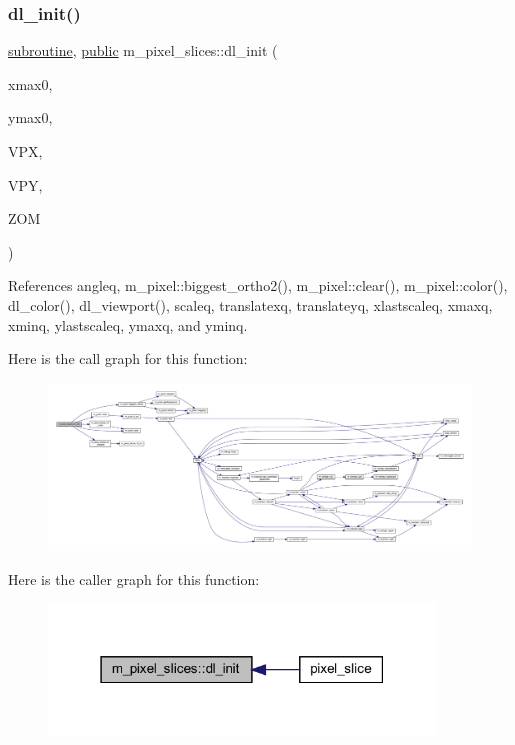 \subsubsection{\texorpdfstring{dl\+\_\+init()}{dl\_init()}}
{\footnotesize\ttfamily \hyperlink{M__stopwatch_83_8txt_acfbcff50169d691ff02d4a123ed70482}{subroutine}, \hyperlink{M__stopwatch_83_8txt_a2f74811300c361e53b430611a7d1769f}{public} m\+\_\+pixel\+\_\+slices\+::dl\+\_\+init (\begin{DoxyParamCaption}\item[{}]{xmax0,  }\item[{}]{ymax0,  }\item[{}]{V\+PX,  }\item[{}]{V\+PY,  }\item[{}]{Z\+OM }\end{DoxyParamCaption})}



References angleq, m\+\_\+pixel\+::biggest\+\_\+ortho2(), m\+\_\+pixel\+::clear(), m\+\_\+pixel\+::color(), dl\+\_\+color(), dl\+\_\+viewport(), scaleq, translatexq, translateyq, xlastscaleq, xmaxq, xminq, ylastscaleq, ymaxq, and yminq.

Here is the call graph for this function\+:
\nopagebreak
\begin{figure}[H]
\begin{center}
\leavevmode
\includegraphics[width=350pt]{namespacem__pixel__slices_a4ac8bc6e1f869e60a675611420fee0f7_cgraph}
\end{center}
\end{figure}
Here is the caller graph for this function\+:
\nopagebreak
\begin{figure}[H]
\begin{center}
\leavevmode
\includegraphics[width=291pt]{namespacem__pixel__slices_a4ac8bc6e1f869e60a675611420fee0f7_icgraph}
\end{center}
\end{figure}
\mbox{\label{namespacem__pixel__slices_a1508683ec3b2444091bb34d40b5d8b93}} 
